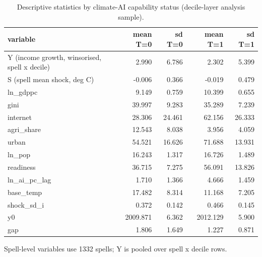 \begin{table}[htbp]
\centering
\caption{Descriptive statistics by climate-AI capability status (decile-layer analysis sample).}
\label{tab:desc}
\begin{tabular}{lrrrr}
\toprule
variable & mean T=0 & sd T=0 & mean T=1 & sd T=1 \\
\midrule
Y (income growth, winsorised, spell x decile) & 2.990 & 6.786 & 2.302 & 5.399 \\
S (spell mean shock, deg C) & -0.006 & 0.366 & -0.019 & 0.479 \\
ln\_gdppc & 9.149 & 0.759 & 10.399 & 0.655 \\
gini & 39.997 & 9.283 & 35.289 & 7.239 \\
internet & 28.306 & 24.461 & 62.156 & 26.333 \\
agri\_share & 12.543 & 8.038 & 3.956 & 4.059 \\
urban & 54.521 & 16.626 & 71.688 & 13.931 \\
ln\_pop & 16.243 & 1.317 & 16.726 & 1.489 \\
readiness & 36.715 & 7.275 & 56.091 & 13.826 \\
ln\_ai\_pc\_lag & 1.710 & 1.366 & 4.666 & 1.459 \\
base\_temp & 17.482 & 8.314 & 11.168 & 7.205 \\
shock\_sd\_i & 0.372 & 0.142 & 0.466 & 0.145 \\
y0 & 2009.871 & 6.362 & 2012.129 & 5.900 \\
gap & 1.806 & 1.649 & 1.227 & 0.871 \\
\bottomrule
\end{tabular}
\par\smallskip\footnotesize Spell-level variables use 1332 spells; Y is pooled over spell x decile rows.
\end{table}
